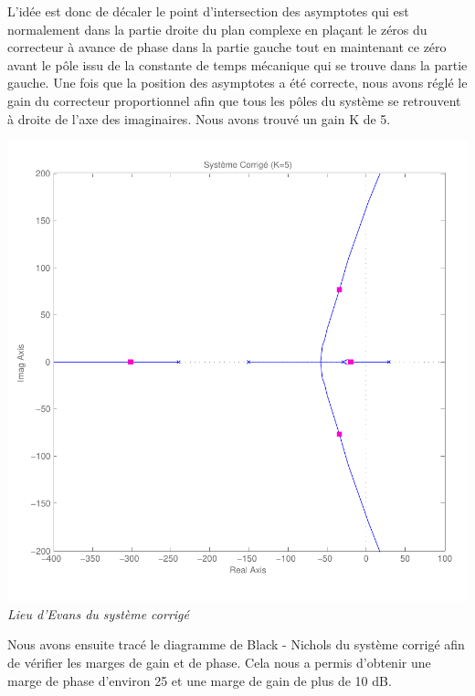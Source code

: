 \documentclass[11pt, french]{article} %
\begin{document}
L'idée est donc de décaler le point d'intersection des asymptotes qui est normalement dans la partie droite du plan complexe en plaçant le zéros du correcteur à avance de phase dans la partie gauche tout en maintenant ce zéro avant le pôle issu de la constante de temps mécanique qui se trouve dans la partie gauche. Une fois que la position des asymptotes a été correcte, nous avons réglé le gain du correcteur proportionnel afin que tous les pôles du système se retrouvent à droite de l'axe des imaginaires. Nous avons trouvé un gain K de 5. 

\begin{center}
\includegraphics[scale=0.50]{RL_Sys_AvPh_K5.pdf}
\\
\emph{Lieu d'Evans du système corrigé}
\end{center}

Nous avons ensuite tracé le diagramme de Black - Nichols du système corrigé afin de vérifier les marges de gain et de phase. Cela nous a permis d'obtenir une marge de phase d'environ 25 et une marge de gain de plus de 10 dB.
\end{document}

